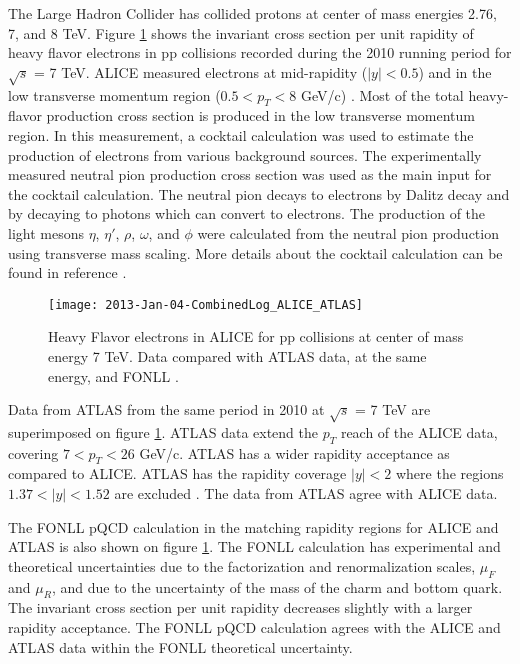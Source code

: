 The Large Hadron Collider has collided protons at center of mass energies 2.76, 7, and 8 TeV. Figure \ref{fig:2013-Jan-03-CombinedLog_ALICE_ATLAS} \cite{Abelev:2012xe} shows the invariant cross section per unit rapidity of heavy flavor electrons in pp collisions recorded during the 2010 running period for $\sqrt{s}$ = 7 TeV. ALICE measured electrons at mid-rapidity ($|y|<0.5$) and in the low transverse momentum region ($0.5 < p_{T}<8$ GeV/c) \cite{Abelev:2012xe}. Most of the total heavy-flavor production cross section is produced in the low transverse momentum region. In this measurement, a cocktail calculation was used to estimate the production of electrons from various background sources. The experimentally measured neutral pion production cross section was used as the main input for the cocktail calculation. The neutral pion decays to electrons by Dalitz decay and by decaying to photons which can convert to electrons. The production of the light mesons $\eta$, $\eta '$, $\rho$, $\omega$, and $\phi$ were calculated from the neutral pion production using transverse mass scaling. More details about the cocktail calculation can be found in reference \cite{Abelev:2012xe}.

\begin{figure}[h]
  \centering
  \texttt{[image: 2013-Jan-04-CombinedLog\_ALICE\_ATLAS]}\\
  \caption{Heavy Flavor electrons in ALICE for pp collisions at center of mass energy 7 TeV. Data compared with ATLAS data, at the same energy, and FONLL \cite{Abelev:2012xe}.} \label{fig:2013-Jan-03-CombinedLog_ALICE_ATLAS}
\end{figure}

Data from ATLAS from the same period in 2010 at $\sqrt{s}$ = 7 TeV are superimposed on figure \ref{fig:2013-Jan-03-CombinedLog_ALICE_ATLAS}. ATLAS data extend the $p_{T}$ reach of the ALICE data, covering $7 < p_{T}<26$ GeV/c. ATLAS has a wider rapidity acceptance as compared to ALICE. ATLAS has the rapidity coverage $|y|<2$ where the regions $1.37<|y|<1.52$ are excluded \cite{Abelev:2012xe}. The data from ATLAS agree with ALICE data. 

The FONLL pQCD calculation in the matching rapidity regions for ALICE and ATLAS is also shown on figure \ref{fig:2013-Jan-03-CombinedLog_ALICE_ATLAS}. The FONLL calculation has experimental and theoretical uncertainties due to the factorization and renormalization scales, $\mu_{F}$ and $\mu_{R}$, and due to the uncertainty of the mass of the charm and bottom quark. The invariant cross section per unit rapidity decreases slightly with a larger rapidity acceptance. The FONLL pQCD calculation agrees with the ALICE and ATLAS data within the FONLL theoretical uncertainty. 



